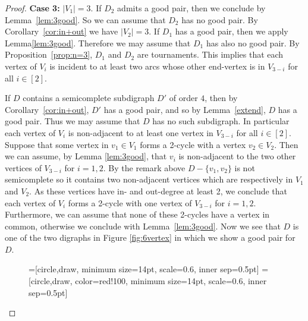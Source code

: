 \documentclass{article}
\theoremstyle{definition}
\newcommand{\2}{\vspace{0.2cm}}
\begin{document}
\begin{proof}
{\bf Case 3:} $|V_1| = 3$. If $D_2$ admits a good pair, then we
conclude by Lemma~\ref{lem:3good}.  So we can assume that $D_2$ has
no good pair.  By Corollary~\ref{cor:in+out} we have $|V_2|=3$. If
$D_1$ has a good pair, then we apply Lemma\ref{lem:3good}.  Therefore
we may assume that $D_1$ has also no good pair.  By
Proposition~\ref{prop:n=3}, $D_1$ and $D_2$ are tournaments.  This
implies that each vertex of $V_i$ is incident to at least two
  arcs whose other end-vertex is in $V_{3-i}$ for all $i\in [2]$.

If $D$ contains a semicomplete subdigraph $D'$ of order $4$, then by
Corollary~\ref{cor:in+out}, $D'$ has a good pair, and so by
Lemma~\ref{extend}, $D$ has a good pair.  Thus we may assume that $D$
has no such subdigraph. In particular each vertex of $V_i$ is
non-adjacent to at least one vertex in $V_{3-i}$ for all $i\in [2]$.
Suppose that some vertex in $v_1\in V_1$ forms a 2-cycle with a vertex
$v_2\in V_2$. Then we can assume, by Lemma \ref{lem:3good}, that $v_i$
is non-adjacent to the two other vertices of $V_{3-i}$ for $i=1,2$. By
the remark above $D-\{v_1,v_2\}$ is not semicomplete so it contains
two non-adjacent vertices which are respectively in $V_1$ and
$V_2$. As these vertices have in- and out-degree at least 2, we
conclude that each vertex of $V_i$ forms a 2-cycle with one vertex of
$V_{3-i}$ for $i=1,2$. Furthermore, we can assume that none of these
2-cycles have a vertex in common, otherwise we conclude with
Lemma~\ref{lem:3good}. Now we see that $D$ is one of the two digraphs
in Figure \ref{fig:6vertex} in which we show a good pair for $D$.

\begin{figure}[H]
\begin{center}
=[circle,draw, minimum size=14pt, scale=0.6, inner sep=0.5pt]
=[circle,draw, color=red!100, minimum size=14pt, scale=0.6, inner sep=0.5pt]
\end{center}
\end{figure}
\end{proof}
\end{document}
